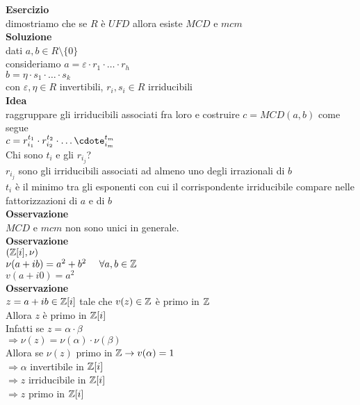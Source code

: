 \documentclass[12px]{article}
\begin{document}
	    \textbf{Esercizio}\\
	    dimostriamo che se $R$ è $UFD$ allora esiste  $MCD$ e  $mcm$ \\
	    \textbf{Soluzione}\\
	    dati $a,b\in R\setminus\{0\}$\\
	    consideriamo  $a = \varepsilon\cdot r_1\cdot\ldots\cdot r_h$\\
	    $b = \eta \cdot s_1\cdot\ldots\cdot s_k$\\
	    con $\varepsilon,\eta\in R$ invertibili, $r_i,s_i\in R$ irriducibili\\
	     \textbf{Idea}\\
	     raggruppare gli irriducibili associati fra loro e costruire $c = MCD(a,b)$ come segue\\
	     $c = r_{i_1}^{t_1}\cdot r_{i_2}^{t_2}\cdot\ldots\cdote_{i_m}^{t_m}$\\
	     Chi sono $t_i$ e gli  $r_{i_j}$?\\
	     $r_{i_j}$ sono gli irriducibili associati ad almeno uno degli irrazionali di  $b$\\
	      $t_i$ è il minimo tra gli esponenti con cui il corrispondente irriducibile compare nelle fattorizzazioni di $a $ e di $b$ \\
	      \textbf{Osservazione}\\
	      $MCD$ e  $mcm$ non sono unici in generale. \\
	      \textbf{Osservazione}\\
	      $(\mathbb{Z}[i],\nu)$\\
	      $\nu(a + ib) = a^2 + b^2\ \ \ \ \forall a,b\in \mathbb{Z}$ \\
	       $v(a + i 0) = a^2$ \\
	       \textbf{Osservazione} \\
	       $z = a +ib\in\mathbb{Z}[i]$ tale che  $v(z)\in\mathbb{Z}$ è primo in  $\mathbb{Z}$\\
	       Allora  $z$ è primo in $\mathbb{Z}[i]$\\
	       Infatti se  $z = \alpha\cdot \beta$\\
	       $ \Rightarrow \nu (z) = \nu(\alpha)\cdot \nu (\beta)$ \\
	       Allora se $\nu(z)$ primo in  $\mathbb{Z} \rightarrow v(\alpha) = 1$\\
	       $ \Rightarrow \alpha$ invertibile in $\mathbb{Z}[i]$\\
	       $ \Rightarrow z$ irriducibile in $\mathbb{Z}[i]$\\
	       $ \Rightarrow z$ primo in $\mathbb{Z}[i]$ \\
\end{document}
